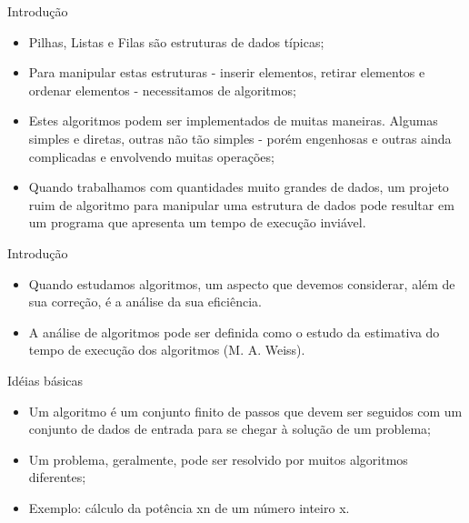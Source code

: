 \documentclass[12pt,table,xcolor={dvipsnames}]{beamer}
\begin{document}
\begin{frame}[fragile]{Introdução}
\begin{itemize}
\item Pilhas, Listas e Filas são estruturas de dados típicas;
\item  Para manipular estas estruturas - inserir elementos, retirar elementos e ordenar elementos - necessitamos de algoritmos;
\item Estes algoritmos podem ser implementados de muitas maneiras. Algumas simples e diretas, outras não tão simples - porém engenhosas e outras ainda complicadas e envolvendo muitas operações;
\item Quando trabalhamos com quantidades muito grandes de dados, um projeto ruim de algoritmo para manipular uma estrutura de dados pode resultar em um programa que apresenta um tempo de execução inviável.
\end{itemize}
\end{frame}

\begin{frame}[fragile]{Introdução}
\begin{itemize}
\item Quando estudamos algoritmos, um aspecto que devemos considerar, além de sua correção, é a análise da sua eficiência.
\item A análise de algoritmos pode ser definida como o estudo da estimativa do tempo de execução dos algoritmos (M. A. Weiss).
\end{itemize}
\end{frame}

\begin{frame}[fragile]{Idéias básicas}
\begin{itemize}
\item Um algoritmo é um conjunto finito de passos que devem ser seguidos com um conjunto de dados de entrada para se chegar à solução de um problema;
\item Um problema, geralmente, pode ser resolvido por muitos algoritmos diferentes;
\item Exemplo: cálculo da potência xn de um número inteiro x.
\end{itemize}
\end{frame}
\end{document}
